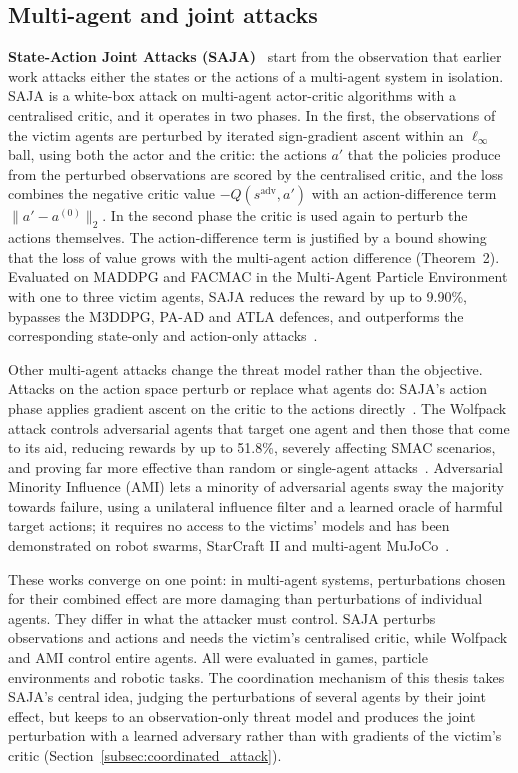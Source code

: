 \subsection{Multi-agent and joint attacks}
\label{subsec:joint_attacks}

\textbf{State-Action Joint Attacks (SAJA)}~\cite{guo2025sajastateactionjointattack} start
from the observation that earlier work attacks either the states or the actions of a
multi-agent system in isolation. SAJA is a white-box attack on multi-agent actor-critic
algorithms with a centralised critic, and it operates in two phases. In the first, the
observations of the victim agents are perturbed by iterated sign-gradient ascent within
an $\ell_\infty$ ball, using both the actor and the critic: the actions $a'$ that the
policies produce from the perturbed observations are scored by the centralised critic,
and the loss combines the negative critic value $-Q(s^{\text{adv}}, a')$ with an
action-difference term $\lVert a' - a^{(0)} \rVert_2$. In the second phase the critic is
used again to perturb the actions themselves. The action-difference term is justified by
a bound showing that the loss of value grows with the multi-agent action difference
(Theorem~2). Evaluated on MADDPG and FACMAC in the Multi-Agent Particle Environment with
one to three victim agents, SAJA reduces the reward by up to 9.90\%, bypasses the
M3DDPG, PA-AD and ATLA defences, and outperforms the corresponding state-only and
action-only attacks~\cite{guo2025sajastateactionjointattack}.

Other multi-agent attacks change the threat model rather than the objective. Attacks on
the action space perturb or replace what agents do: SAJA's action phase applies gradient
ascent on the critic to the actions directly~\cite{guo2025sajastateactionjointattack}.
The Wolfpack attack controls adversarial agents that target one agent and then those
that come to its aid, reducing rewards by up to 51.8\%, severely affecting SMAC
scenarios, and proving far more effective than random or single-agent
attacks~\cite{lee2025wolfpackadversarialattackrobust}.
Adversarial Minority Influence (AMI) lets a minority of adversarial agents sway the
majority towards failure, using a unilateral influence filter and a learned oracle of
harmful target actions; it requires no access to the victims' models and has been
demonstrated on robot swarms, StarCraft II and multi-agent MuJoCo~\cite{li2025attacking}.

These works converge on one point: in multi-agent systems, perturbations chosen for
their combined effect are more damaging than perturbations of individual agents. They
differ in what the attacker must control. SAJA perturbs observations and actions and
needs the victim's centralised critic, while Wolfpack and AMI control entire agents. All
were evaluated in games, particle environments and robotic tasks. The coordination mechanism of
this thesis takes SAJA's central idea, judging the perturbations of several agents by
their joint effect, but keeps to an observation-only threat model and produces the joint
perturbation with a learned adversary rather than with gradients of the victim's critic
(Section~\ref{subsec:coordinated_attack}).

